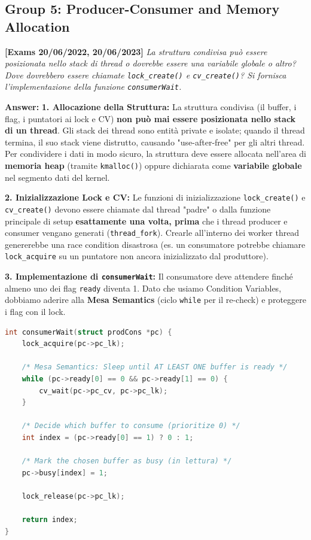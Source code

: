 \newpage
\subsection*{Group 5: Producer-Consumer and Memory Allocation}

\textbf{[Exams 20/06/2022, 20/06/2023]}
\textit{La struttura condivisa può essere posizionata nello stack di thread o dovrebbe essere una variabile globale o altro? Dove dovrebbero essere chiamate \texttt{lock\_create()} e \texttt{cv\_create()}? Si fornisca l'implementazione della funzione \texttt{consumerWait}.}

\textbf{Answer:}
\textbf{1. Allocazione della Struttura:} La struttura condivisa (il buffer, i flag, i puntatori ai lock e CV) \textbf{non può mai essere posizionata nello stack di un thread}. Gli stack dei thread sono entità private e isolate; quando il thread termina, il suo stack viene distrutto, causando "use-after-free" per gli altri thread. Per condividere i dati in modo sicuro, la struttura deve essere allocata nell'area di \textbf{memoria heap} (tramite \texttt{kmalloc()}) oppure dichiarata come \textbf{variabile globale} nel segmento dati del kernel.

\textbf{2. Inizializzazione Lock e CV:} Le funzioni di inizializzazione \texttt{lock\_create()} e \texttt{cv\_create()} devono essere chiamate dal thread "padre" o dalla funzione principale di setup \textbf{esattamente una volta, prima} che i thread producer e consumer vengano generati (\texttt{thread\_fork}). Crearle all'interno dei worker thread genererebbe una race condition disastrosa (es. un consumatore potrebbe chiamare \texttt{lock\_acquire} su un puntatore non ancora inizializzato dal produttore).

\textbf{3. Implementazione di \texttt{consumerWait}:}
Il consumatore deve attendere finché almeno uno dei flag \texttt{ready} diventa 1. Dato che usiamo Condition Variables, dobbiamo aderire alla \textbf{Mesa Semantics} (ciclo \texttt{while} per il re-check) e proteggere i flag con il lock.
\begin{lstlisting}[language=C]
int consumerWait(struct prodCons *pc) {
    lock_acquire(pc->pc_lk);
    
    /* Mesa Semantics: Sleep until AT LEAST ONE buffer is ready */
    while (pc->ready[0] == 0 && pc->ready[1] == 0) {
        cv_wait(pc->pc_cv, pc->pc_lk);
    }
    
    /* Decide which buffer to consume (prioritize 0) */
    int index = (pc->ready[0] == 1) ? 0 : 1;
    
    /* Mark the chosen buffer as busy (in lettura) */
    pc->busy[index] = 1;
    
    lock_release(pc->pc_lk);
    
    return index;
}
\end{lstlisting}

